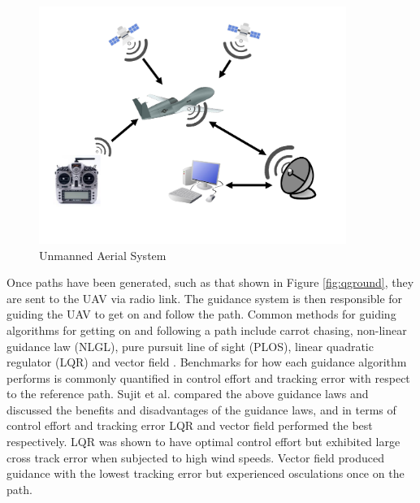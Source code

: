 \documentclass[numbered,pdftex]{ohio-etd}
\begin{document}
\begin{figure}[H]
	\centering
	\includegraphics[width=10cm]{PaperFigures/UAS}
	\caption{Unmanned Aerial System}
	\label{fig:uas}
\end{figure}

Once paths have been generated, such as that shown in Figure \ref{fig:qground}, they are sent to the UAV via radio link. The guidance system is then responsible for guiding the UAV to get on and follow the path. Common methods for guiding algorithms for getting on and following a path include carrot chasing, non-linear guidance law (NLGL), pure pursuit line of sight (PLOS), linear quadratic regulator (LQR) and vector field \cite{sujit_unmanned_2014}. Benchmarks for how each guidance algorithm performs is commonly quantified in control effort and tracking error with respect to the reference path. Sujit et al. compared the above guidance laws and discussed the benefits and disadvantages of the guidance laws, and in terms of control effort and tracking error LQR and vector field performed the best respectively. LQR was shown to have optimal control effort but exhibited large cross track error when subjected to high wind speeds. Vector field produced guidance with the lowest tracking error but experienced osculations once on the path. 
\end{document}
